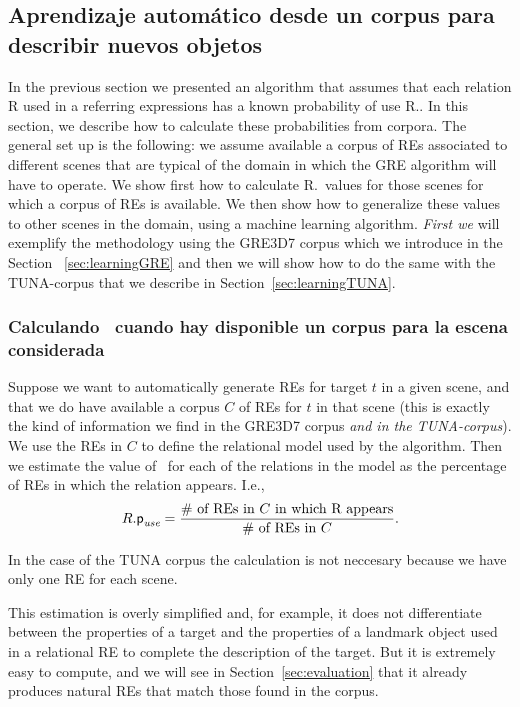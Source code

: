 \subsection{Aprendizaje autom\'atico desde un corpus para describir nuevos objetos}
\label{sec:learning}

In the previous section we presented an algorithm that assumes that
each relation R used in a referring expressions has a known
probability of use R.\puse. In this section, we describe how to
calculate these probabilities from corpora.  The general set up is the
following: we assume available a corpus of REs associated to different
scenes that are typical of the domain in which the GRE algorithm will
have to operate.  We show first how to calculate R.\puse\ values for
those scenes for which a corpus of REs is available.  We then show how
to generalize these values to other scenes in the domain, using a
machine learning algorithm. \textit{First we} will exemplify the
methodology using the GRE3D7 corpus which we introduce in the Section
~\ref{sec:learningGRE} and then we will show how to do the same with
the TUNA-corpus that we describe in Section~\ref{sec:learningTUNA}.

\subsubsection{Calculando \puse\ cuando hay disponible un corpus para la escena considerada}

Suppose we want to automatically generate REs for target $t$ in a
given scene, and that we do have available a corpus $C$ of REs for $t$
in that scene (this is exactly the kind of information we find in the
GRE3D7 corpus \textit{and in the TUNA-corpus}).  We use the REs in $C$
to define the relational model used by the algorithm.  Then we
estimate the value of \puse\ for each of the relations in the model as
the percentage of REs in which the relation appears.  I.e.,
\begin{equation}\label{eq1}
R.\textsf{p}_\textit{use} = \frac{\# \mbox{ of REs in $C$ in which R appears}}{\# \mbox{ of REs in $C$}}.
\end{equation}

In the case of the TUNA corpus the calculation is not neccesary
because we have only one RE for each scene.

This estimation is overly simplified and, for example, it does not
differentiate between the properties of a target and the properties of
a landmark object used in a relational RE to complete the description
of the target.  But it is extremely easy to compute, and we will see
in Section~\ref{sec:evaluation} that it already produces natural REs
that match those found in the corpus.

